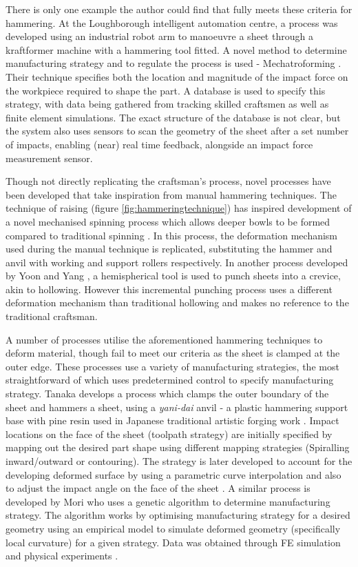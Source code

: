 There is only one example the author could find that fully meets these criteria for hammering. At the Loughborough intelligent automation centre, a process was developed using an industrial robot arm to manoeuvre a sheet through a kraftformer machine with a hammering tool fitted. A novel method to determine manufacturing strategy and to regulate the process is used - Mechatroforming \citep{Ilangovan2016AnForming}. Their technique specifies both the location and magnitude of the impact force on the workpiece required to shape the part. A database is used to specify this strategy, with data being gathered from tracking skilled craftsmen as well as finite element simulations. The exact structure of the database is not clear, but the system also uses sensors to scan the geometry of the sheet after a set number of impacts, enabling (near) real time feedback, alongside an impact force measurement sensor.

Though not directly replicating the craftsman's process, novel processes have been developed that take inspiration from manual hammering techniques. The technique of raising (figure \ref{fig:hammeringtechnique}) has inspired development of a novel mechanised spinning process which allows deeper bowls to be formed compared to traditional spinning \citep{Russo2020RaisingSpinning}. In this process, the deformation mechanism used during the manual technique is replicated, substituting the hammer and anvil with working and support rollers respectively. In another process developed by Yoon and Yang \citep{Yoon2001InvestigationMetal}, a hemispherical tool is used to punch sheets into a crevice, akin to hollowing. However this incremental punching process uses a different deformation mechanism than traditional hollowing and makes no reference to the traditional craftsman.

A number of processes utilise the aforementioned hammering techniques to deform material, though fail to meet our criteria as the sheet is clamped at the outer edge. These processes use a variety of manufacturing strategies, the most straightforward of which uses predetermined control to specify manufacturing strategy. Tanaka develops a process which clamps the outer boundary of the sheet and hammers a sheet, using a \textit{yani-dai} anvil - a plastic hammering support base with pine resin used in Japanese traditional artistic forging work \citep{Tanaka2005DevelopmentWorking}. Impact locations on the face of the sheet (toolpath strategy) are initially specified by mapping out the desired part shape using different mapping strategies (Spiralling inward/outward or contouring). The strategy is later developed to account for the developing deformed surface by using a parametric curve interpolation \citep{Asakawa2010DevelopmentProcess} and also to adjust the impact angle on the face of the sheet \citep{Takasugi2012DevelopmentShape}. A similar process is developed by Mori who uses a genetic algorithm to determine manufacturing strategy. The algorithm works by optimising manufacturing strategy for a desired geometry using an empirical model to simulate deformed geometry (specifically local curvature) for a given strategy. Data was obtained through FE simulation and physical experiments \citep{Mori1996DeterminationAlgorithm}. 

